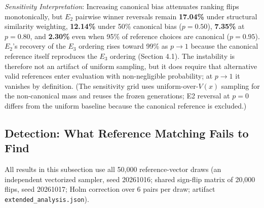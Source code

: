 \documentclass[11pt]{article}
\begin{document}
\emph{Sensitivity Interpretation}: Increasing canonical bias attenuates ranking flips monotonically, but $E_2$ pairwise winner reversals remain \textbf{17.04\%} under structural similarity weighting, \textbf{12.14\%} under 50\% canonical bias ($p=0.50$), \textbf{7.35\%} at $p=0.80$, and \textbf{2.30\%} even when 95\% of reference choices are canonical ($p=0.95$). $E_2$'s recovery of the $E_3$ ordering rises toward 99\% as $p \to 1$ because the canonical reference itself reproduces the $E_3$ ordering (Section 4.1). The instability is therefore not an artifact of uniform sampling, but it does require that alternative valid references enter evaluation with non-negligible probability; at $p \to 1$ it vanishes by definition. (The sensitivity grid uses uniform-over-$V(x)$ sampling for the non-canonical mass and reuses the frozen generations; E2 reversal at $p=0$ differs from the uniform baseline because the canonical reference is excluded.)

\subsection{Detection: What Reference Matching Fails to Find}
All results in this subsection use all 50,000 reference-vector draws (an independent vectorized sampler, seed 20261016; shared sign-flip matrix of 20,000 flips, seed 20261017; Holm correction over 6 pairs per draw; artifact \texttt{extended\_analysis.json}).
\end{document}

